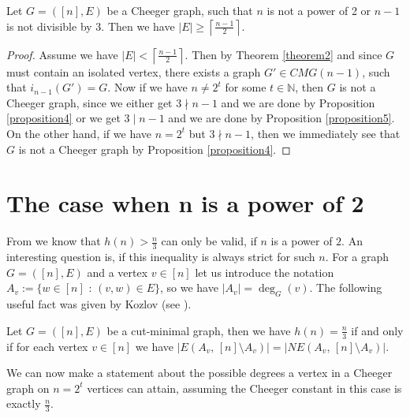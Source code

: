 \begin{prop}
Let \(G=([n],E)\) be a Cheeger graph, such that \(n\) is not a power of 2 or \(n-1\) is not divisible by 3. Then we have \(|E|\geq\left\lceil\frac{n-1}{2}\right\rceil\).
\begin{proof}
Assume we have \(|E|<\left\lceil\frac{n-1}{2}\right\rceil\). Then by Theorem \ref{theorem2} and since \(G\) must contain an isolated vertex, there exists a graph \(G'\in CMG(n-1)\), such that \(i_{n-1}(G')=G\). Now if we have \(n\neq 2^t\) for some \(t\in\mathbb{N}\), then \(G\) is not a Cheeger graph, since we either get \(3\nmid n-1\) and we are done by Proposition \ref{proposition4} or we get \(3\mid n-1\) and we are done by Proposition \ref{proposition5}. On the other hand, if we have \(n=2^t\) but \(3\nmid n-1\), then we immediately see that \(G\) is not a Cheeger graph by Proposition \ref{proposition4}.
\end{proof}
\end{prop}

\section{The case when n is a power of 2}

From \cite{1} we know that \(h(n)>\frac{n}{3}\) can only be valid, if \(n\) is a power of \(2\). An interesting question is, if this inequality is always strict for such \(n\). For a graph \(G=([n],E)\) and a vertex \(v\in [n]\) let us introduce the notation \(A_v:=\{w\in [n]\text{ : }(v,w)\in E\}\), so we have \(|A_v|=\deg_G(v)\). The following useful fact was given by Kozlov (see \cite{1}).

\begin{lem}\label{lemma11:2}
Let \(G=([n],E)\) be a cut-minimal graph, then we have \(h(n)=\frac{n}{3}\) if and only if for each vertex \(v\in [n]\) we have \(|E(A_v\text{, }[n]\setminus A_v)|=|NE(A_v\text{, }[n]\setminus A_v)|\).
\end{lem}

We can now make a statement about the possible degrees a vertex in a Cheeger graph on \(n=2^t\) vertices can attain, assuming the Cheeger constant in this case is exactly \(\frac{n}{3}\).

